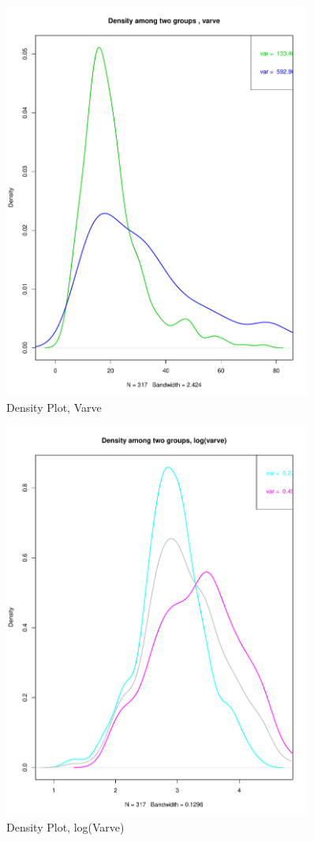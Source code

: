 \documentclass{article}
\begin{document}
\begin{figure}
	\centering
	\includegraphics[width=0.9\textwidth]{DensityVarve}
	\caption{Density Plot, Varve }
	\label{fig:Density-lvarve-Plot}
\end{figure}

\begin{figure}
	\centering
	\includegraphics[width=0.9\textwidth]{Densitylvarve}
	\caption{Density Plot, log(Varve) }
	\label{fig:Density-varve-Plot}
\end{figure}
\end{document}
